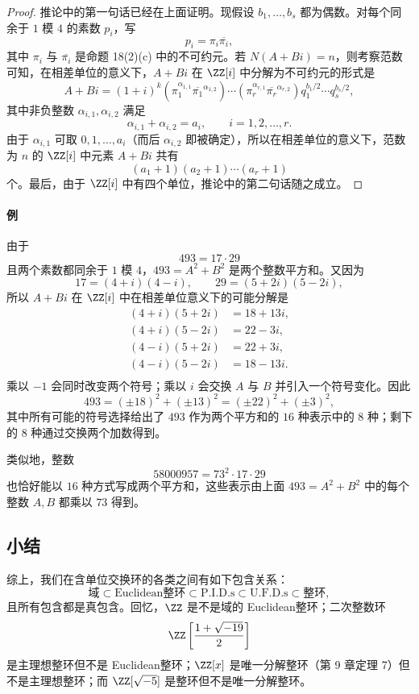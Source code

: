 \begin{proof}
	推论中的第一句话已经在上面证明。现假设 $b_1,\ldots,b_s$ 都为偶数。对每个同余于 $1$ 模 $4$ 的素数 $p_i$，写
	\[
	p_i=\pi_i\overline{\pi_i},
	\]
	其中 $\pi_i$ 与 $\overline{\pi_i}$ 是命题 18(2)(c) 中的不可约元。若 $N(A+Bi)=n$，则考察范数可知，在相差单位的意义下，$A+Bi$ 在 $\ZZ[i]$ 中分解为不可约元的形式是
	\[
	A+Bi=(1+i)^k
	(\pi_1^{\alpha_{1,1}}\overline{\pi_1}^{\alpha_{1,2}})\cdots
	(\pi_r^{\alpha_{r,1}}\overline{\pi_r}^{\alpha_{r,2}})
	q_1^{b_1/2}\cdots q_s^{b_s/2},
	\]
	其中非负整数 $\alpha_{i,1},\alpha_{i,2}$ 满足
	\[
	\alpha_{i,1}+\alpha_{i,2}=a_i,
	\qquad i=1,2,\ldots,r.
	\]
	由于 $\alpha_{i,1}$ 可取 $0,1,\ldots,a_i$（而后 $\alpha_{i,2}$ 即被确定），所以在相差单位的意义下，范数为 $n$ 的 $\ZZ[i]$ 中元素 $A+Bi$ 共有
	\[
	(a_1+1)(a_2+1)\cdots(a_r+1)
	\]
	个。最后，由于 $\ZZ[i]$ 中有四个单位，推论中的第二句话随之成立。
\end{proof}

\paragraph{例}
由于
\[
493=17\cdot29
\]
且两个素数都同余于 $1$ 模 $4$，$493=A^2+B^2$ 是两个整数平方和。又因为
\[
17=(4+i)(4-i),
\qquad
29=(5+2i)(5-2i),
\]
所以 $A+Bi$ 在 $\ZZ[i]$ 中在相差单位意义下的可能分解是
\begin{align*}
(4+i)(5+2i)&=18+13i,\\
(4+i)(5-2i)&=22-3i,\\
(4-i)(5+2i)&=22+3i,\\
(4-i)(5-2i)&=18-13i.\\
\end{align*}
乘以 $-1$ 会同时改变两个符号；乘以 $i$ 会交换 $A$ 与 $B$ 并引入一个符号变化。因此
\[
493=(\pm18)^2+(\pm13)^2=(\pm22)^2+(\pm3)^2,
\]
其中所有可能的符号选择给出了 $493$ 作为两个平方和的 $16$ 种表示中的 $8$ 种；剩下的 $8$ 种通过交换两个加数得到。

类似地，整数
\[
58000957=73^2\cdot17\cdot29
\]
也恰好能以 $16$ 种方式写成两个平方和，这些表示由上面 $493=A^2+B^2$ 中的每个整数 $A,B$ 都乘以 $73$ 得到。

\subsection*{小结}

综上，我们在含单位交换环的各类之间有如下包含关系：
\[
\text{域}\subset \text{Euclidean整环}\subset \text{P.I.D.s}\subset \text{U.F.D.s}\subset \text{整环},
\]
且所有包含都是真包含。回忆，$\ZZ$ 是不是域的 Euclidean整环；二次整数环
\[
\ZZ\left[{1+\sqrt{-19}\over2}\right]
\]
是主理想整环但不是 Euclidean整环；$\ZZ[x]$ 是唯一分解整环（第 9 章定理 7）但不是主理想整环；而 $\ZZ[\sqrt{-5}]$ 是整环但不是唯一分解整环。

